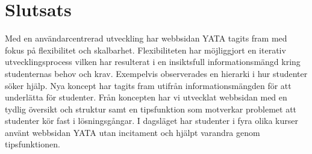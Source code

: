 \chapter{Slutsats}




Med en användarcentrerad utveckling har webbsidan YATA tagits fram med fokus på flexibilitet och skalbarhet. Flexibiliteten har möjliggjort en iterativ utvecklingsprocess vilken har resulterat i en insiktsfull informationsmängd kring studenternas behov och krav. Exempelvis observerades en hierarki i hur studenter söker hjälp. Nya koncept har tagits fram utifrån informationsmängden för att underlätta för studenter. Från koncepten har vi utvecklat webbsidan med en tydlig översikt och struktur samt en tipsfunktion som motverkar problemet att studenter kör fast i lösningsgångar. I dagsläget har studenter i fyra olika kurser använt webbsidan YATA utan incitament och hjälpt varandra genom tipsfunktionen.

